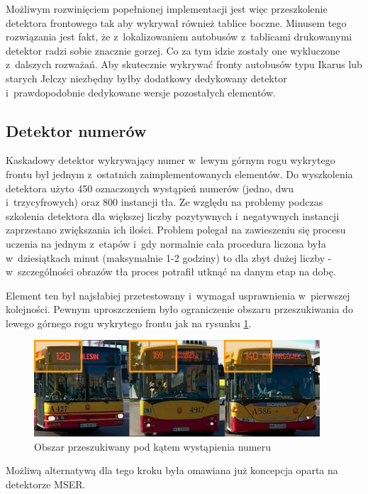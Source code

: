 Możliwym rozwinięciem popełnionej implementacji jest więc przeszkolenie
detektora frontowego tak aby wykrywał również tablice boczne. Minusem
tego rozwiązania jest fakt, że z~lokalizowaniem autobusów z~tablicami
drukowanymi detektor radzi sobie znacznie gorzej. Co za tym idzie
zostały one wykluczone z~dalszych rozważań. Aby skutecznie wykrywać
fronty autobusów typu Ikarus lub starych Jelczy niezbędny byłby 
dodatkowy dedykowany detektor i~prawdopodobnie dedykowane wersje
pozostałych elementów.

\subsection{Detektor numerów}

Kaskadowy detektor wykrywający numer w~lewym górnym rogu wykrytego
frontu był jednym z~ostatnich zaimplementowanych elementów. Do wyszkolenia
detektora użyto 450 oznaczonych wystąpień numerów (jedno, dwu
i~trzycyfrowych) oraz 800 instancji tła. Ze względu na problemy podczas
szkolenia detektora dla większej liczby pozytywnych i~negatywnych 
instancji zaprzestano zwiększania ich ilości. Problem polegał na
zawieszeniu się procesu uczenia na jednym z~etapów i~gdy normalnie 
cała procedura liczona była w~dziesiątkach minut (maksymalnie 1-2 godziny)
to dla zbyt dużej liczby - w~szczególności obrazów tła proces potrafił
utknąć na danym etap na dobę.

Element ten był najsłabiej przetestowany i~wymagał usprawnienia 
w~pierwszej kolejności. Pewnym uproszczeniem było
ograniczenie obszaru przeszukiwania do lewego górnego rogu wykrytego
frontu jak na rysunku \ref{fig:frontupperleft}.

\begin{figure}[!h]
    \centering
    \includegraphics[width=0.95\textwidth]{img/exp_front_upper_left}
    \caption{Obszar przeszukiwany pod kątem wystąpienia numeru}
    \label{fig:frontupperleft}
\end{figure}

Możliwą alternatywą dla tego kroku była omawiana już koncepcja
oparta na detektorze MSER.

